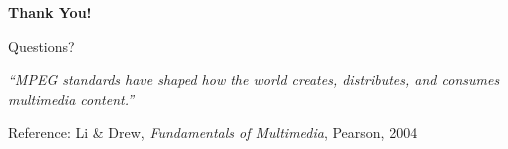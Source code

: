 \documentclass[aspectratio=169,12pt]{beamer}
\begin{document}
\begin{frame}
    \begin{center}
        \Huge{\textbf{Thank You!}}
        
        \vspace{1cm}
        \Large{Questions?}
        
        \vspace{1.5cm}
        \normalsize
        \textit{``MPEG standards have shaped how the world creates, distributes, and consumes multimedia content.''}
        
        \vspace{0.5cm}
        \small{Reference: Li \& Drew, \textit{Fundamentals of Multimedia}, Pearson, 2004}
    \end{center}
\end{frame}
\end{document}

